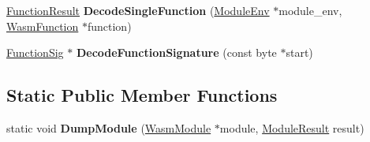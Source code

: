 \begin{DoxyCompactItemize}
\item 
\hyperlink{structv8_1_1internal_1_1wasm_1_1_result}{Function\+Result} {\bfseries Decode\+Single\+Function} (\hyperlink{structv8_1_1internal_1_1wasm_1_1_module_env}{Module\+Env} $\ast$module\+\_\+env, \hyperlink{structv8_1_1internal_1_1wasm_1_1_wasm_function}{Wasm\+Function} $\ast$function)\hypertarget{classv8_1_1internal_1_1wasm_1_1_module_decoder_a0e15cd2c6c958e4bca7532a6dad92195}{}\label{classv8_1_1internal_1_1wasm_1_1_module_decoder_a0e15cd2c6c958e4bca7532a6dad92195}

\item 
\hyperlink{classv8_1_1internal_1_1_signature}{Function\+Sig} $\ast$ {\bfseries Decode\+Function\+Signature} (const byte $\ast$start)\hypertarget{classv8_1_1internal_1_1wasm_1_1_module_decoder_ae0c8611f789131425b6a18b24b6b1173}{}\label{classv8_1_1internal_1_1wasm_1_1_module_decoder_ae0c8611f789131425b6a18b24b6b1173}

\end{DoxyCompactItemize}
\subsection*{Static Public Member Functions}
\begin{DoxyCompactItemize}
\item 
static void {\bfseries Dump\+Module} (\hyperlink{structv8_1_1internal_1_1wasm_1_1_wasm_module}{Wasm\+Module} $\ast$module, \hyperlink{structv8_1_1internal_1_1wasm_1_1_result}{Module\+Result} result)\hypertarget{classv8_1_1internal_1_1wasm_1_1_module_decoder_ae7d20f160f76c2d6b5137d58d9d1e123}{}\label{classv8_1_1internal_1_1wasm_1_1_module_decoder_ae7d20f160f76c2d6b5137d58d9d1e123}

\end{DoxyCompactItemize}
